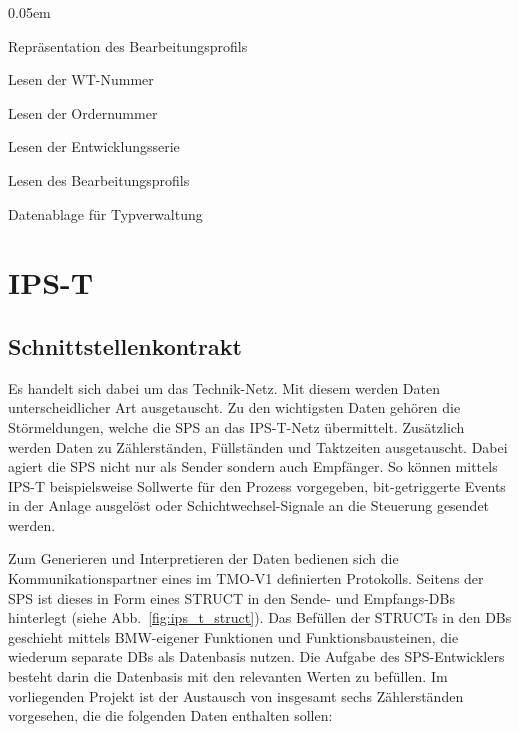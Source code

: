 \begin{description}
    \itemsep 0.05em
    \item [\texttt{UDT\_PROCESS\_PROFILE}] Repräsentation des Bearbeitungsprofils
    \item [\texttt{FC\_GET\_WT\_NO}] Lesen der WT-Nummer
    \item [\texttt{FC\_GET\_OR}] Lesen der Ordernummer
    \item [\texttt{FC\_GET\_SERIES}] Lesen der Entwicklungsserie
    \item [\texttt{FC\_GET\_PROCESS\_PROFILE}] Lesen des Bearbeitungsprofils
    \item [\texttt{DB\_TYPE\_ADMIN}] Datenablage für Typverwaltung
\end{description}

\section{IPS-T}
\label{sec:ips_t}

\subsection{Schnittstellenkontrakt}
\label{subsec:ips_t_contract}

 Es handelt sich dabei um das Technik-Netz. Mit diesem werden Daten unterscheidlicher Art ausgetauscht. Zu den wichtigsten Daten gehören die Störmeldungen, welche die SPS an das IPS-T-Netz übermittelt. Zusätzlich werden Daten zu Zählerständen, Füllständen und Taktzeiten ausgetauscht. Dabei agiert die SPS nicht nur als Sender sondern auch Empfänger. So können mittels IPS-T beispielsweise Sollwerte für den Prozess  vorgegeben, bit-getriggerte Events in der Anlage ausgelöst oder Schichtwechsel-Signale an die Steuerung gesendet werden. 


Zum Generieren und Interpretieren der Daten bedienen sich die Kommunikationspartner eines im TMO-V1 definierten Protokolls. Seitens der SPS ist dieses in Form eines STRUCT in den Sende- und Empfangs-DBs hinterlegt (siehe Abb.~\ref{fig:ips_t_struct}). Das Befüllen der STRUCTs in den DBs geschieht mittels BMW-eigener Funktionen und Funktionsbausteinen, die wiederum separate DBs als Datenbasis nutzen. Die Aufgabe des SPS-Entwicklers besteht darin die Datenbasis mit den relevanten Werten zu befüllen. Im vorliegenden Projekt ist der Austausch von insgesamt sechs Zählerständen vorgesehen, die die folgenden Daten enthalten sollen: 

